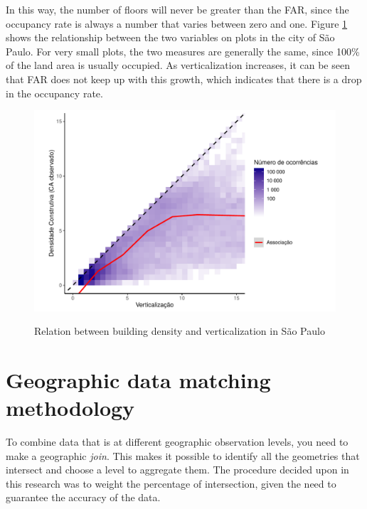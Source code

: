 \begin{apendicesenv}
    In this way, the number of floors will never be greater than the FAR, since the occupancy rate is always a number that varies between zero and one. Figure \ref{fig:ca-vert} shows the relationship between the two variables on plots in the city of São Paulo. For very small plots, the two measures are generally the same, since 100\% of the land area is usually occupied. As verticalization increases, it can be seen that FAR does not keep up with this growth, which indicates that there is a drop in the occupancy rate.
    
    \begin{figure}[h]
        \centering
        \caption{Relation between building density and verticalization in São Paulo}
        \includegraphics[width = \textwidth]{figuras/ca_vs_verticalizacao.pdf}
        \label{fig:ca-vert}
    \end{figure}
    
    \chapter{Geographic data matching methodology}
    \label{appendix:cross-referencing}
    
    To combine data that is at different geographic observation levels, you need to make a geographic \textit{join}. This makes it possible to identify all the geometries that intersect and choose a level to aggregate them. The procedure decided upon in this research was to weight the percentage of intersection, given the need to guarantee the accuracy of the data.
    

\end{apendicesenv}
